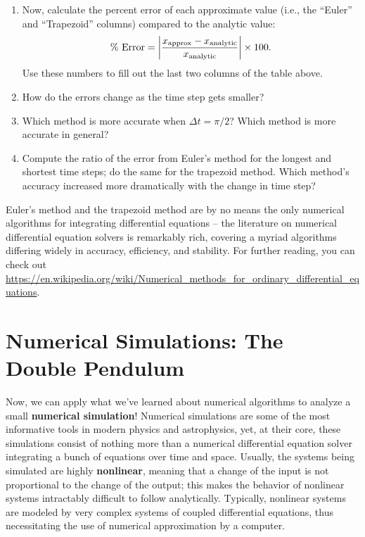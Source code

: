 \documentclass[11pt]{article}
\begin{document}
\begin{enumerate}[resume]
    \item Now, calculate the percent error of each approximate value (i.e., the ``Euler'' and ``Trapezoid'' columns) compared to the analytic value:
    \begin{equation} \label{eq:error}
    \text{\% Error} = \left|\frac{x_{\rm approx} - x_{\rm analytic}}{x_{\rm analytic}}\right| \times 100.
    \end{equation}
    Use these numbers to fill out the last two columns of the table above.
    \item How do the errors change as the time step gets smaller?
    \item Which method is more accurate when $\Delta t = \pi/2$? Which method is more accurate in general?
    \item Compute the ratio of the error from Euler's method for the longest and shortest time steps; do the same for the trapezoid method. Which method's accuracy increased more dramatically with the change in time step?
\end{enumerate}

\noindent
Euler's method and the trapezoid method are by no means the only numerical algorithms for integrating differential equations -- the literature on numerical differential equation solvers is remarkably rich, covering a myriad  algorithms differing widely in accuracy, efficiency, and stability. For further reading, you can check out \url{https://en.wikipedia.org/wiki/Numerical_methods_for_ordinary_differential_equations}.

\section{Numerical Simulations: The Double Pendulum}

Now, we can apply what we've learned about numerical algorithms to analyze a small \textbf{numerical simulation}! Numerical simulations are some of the most informative tools in modern physics and astrophysics, yet, at their core, these simulations consist of nothing more than a numerical differential equation solver integrating a bunch of equations over time and space. Usually, the systems being simulated are highly \textbf{nonlinear}, meaning that a change of the input is not proportional to the change of the output; this makes the behavior of nonlinear systems intractably difficult to follow analytically. Typically, nonlinear systems are modeled by very complex systems of coupled differential equations, thus necessitating the use of numerical approximation by a computer. \vspace{\baselineskip}
\end{document}
